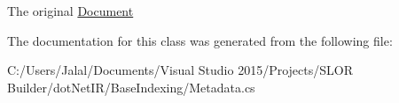 The original \hyperlink{classdot_net_i_r_1_1_base_indexing_1_1_document}{Document} 



The documentation for this class was generated from the following file\+:\begin{DoxyCompactItemize}
\item 
C\+:/\+Users/\+Jalal/\+Documents/\+Visual Studio 2015/\+Projects/\+S\+L\+O\+R Builder/dot\+Net\+I\+R/\+Base\+Indexing/Metadata.\+cs\end{DoxyCompactItemize}
